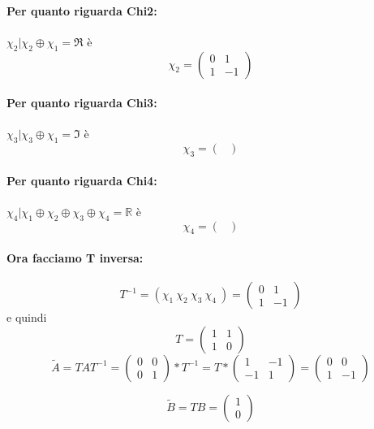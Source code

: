 \documentclass{article}
\begin{document}
\paragraph{Per quanto riguarda Chi2:} $ \chi_2 | \chi_2 \oplus \chi_1 = \mathfrak{R} $ è \[ \chi_2 = \left(\begin{matrix}0 & 1\\1 & -1\end{matrix}\right) \]

\paragraph{Per quanto riguarda Chi3:} $ \chi_3 | \chi_3 \oplus \chi_1 = \mathfrak{I} $ è \[ \chi_3 = \left(\begin{matrix}\end{matrix}\right) \]

\paragraph{Per quanto riguarda Chi4:} $ \chi_4 | \chi_1 \oplus \chi_2 \oplus  \chi_3 \oplus \chi_4 = \mathbb{R} $ è \[ \chi_4 = \left(\begin{matrix}\end{matrix}\right) \]
\paragraph{Ora facciamo T inversa:} \[ T^{-1} = (\chi_1\ \chi_2\ \chi_3\ \chi_4\ ) = \left(\begin{matrix}0 & 1\\1 & -1\end{matrix}\right) \]
e quindi \[T = \left(\begin{matrix}1 & 1\\1 & 0\end{matrix}\right)\]
\[ \widetilde{A} = TAT^{-1} = \left(\begin{matrix}0 & 0\\0 & 1\end{matrix}\right) * T^{-1} = T*\left(\begin{matrix}1 & -1\\-1 & 1\end{matrix}\right) =\left(\begin{matrix}0 & 0\\1 & -1\end{matrix}\right) \]

\[ \widetilde{B} = T B = \left(\begin{matrix}1\\0\end{matrix}\right) \]
\end{document}
